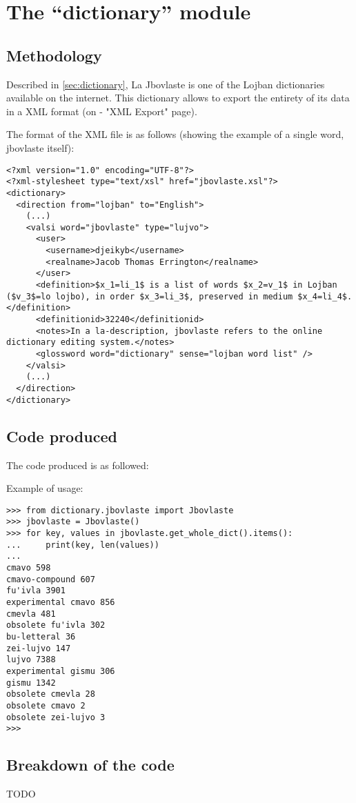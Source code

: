\chapter{The ``dictionary'' module}

\section{Methodology}

\label{sub:creating_a_dictionary}

Described in \ref{sec:dictionary}, La Jbovlaste is one of the Lojban dictionaries available on the internet.
This dictionary allows to export the entirety of its data in a XML format (on \cite{jbovlaste} - "XML Export" page).\\

\newpage

The format of the XML file is as follows (showing the example of a single word, jbovlaste itself): \\

\begin{lstlisting}
<?xml version="1.0" encoding="UTF-8"?>
<?xml-stylesheet type="text/xsl" href="jbovlaste.xsl"?>
<dictionary>
  <direction from="lojban" to="English">
    (...)
    <valsi word="jbovlaste" type="lujvo">
      <user>
        <username>djeikyb</username>
        <realname>Jacob Thomas Errington</realname>
      </user>
      <definition>$x_1=li_1$ is a list of words $x_2=v_1$ in Lojban ($v_3$=lo lojbo), in order $x_3=li_3$, preserved in medium $x_4=li_4$.</definition>
      <definitionid>32240</definitionid>
      <notes>In a la-description, jbovlaste refers to the online dictionary editing system.</notes>
      <glossword word="dictionary" sense="lojban word list" />
    </valsi>
    (...)
  </direction>
</dictionary>
\end{lstlisting}

\newpage

\section{Code produced}

The code produced is as followed:



Example of usage:

\begin{lstlisting}
>>> from dictionary.jbovlaste import Jbovlaste
>>> jbovlaste = Jbovlaste()
>>> for key, values in jbovlaste.get_whole_dict().items():
...     print(key, len(values))
...
cmavo 598
cmavo-compound 607
fu'ivla 3901
experimental cmavo 856
cmevla 481
obsolete fu'ivla 302
bu-letteral 36
zei-lujvo 147
lujvo 7388
experimental gismu 306
gismu 1342
obsolete cmevla 28
obsolete cmavo 2
obsolete zei-lujvo 3
>>>
\end{lstlisting}

\section{Breakdown of the code}

TODO